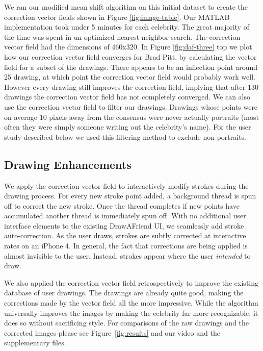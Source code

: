 We ran our modified mean shift algorithm on this initial dataset to create the correction vector fields shown in Figure \ref{fig:image-table}. Our MATLAB implementation took under 5 minutes for each celebrity.  The great majority of the time was spent in un-optimized nearest neighbor search. The correction vector field had the dimensions of 460x320. In Figure \ref{fig:daf-three} top we plot how our correction vector field converges for Brad Pitt, by calculating the vector field for a subset of the drawings. There appears to be an inflection point around 25 drawing, at which point the correction vector field would probably work well. However every drawing still improves the correction field, implying that after 130 drawings the correction vector field has not completely converged. We can also use the correction vector field to filter our drawings. Drawings whose points were on average 10 pixels away from the consensus were never actually portraits (most often they were simply someone writing out the celebrity's name). For the user study described below we used this filtering method to exclude non-portraits. 




\subsection {Drawing Enhancements}

We apply the correction vector field to interactively modify strokes during the drawing process. For every new stroke point added, a background thread is spun off to correct the new stroke. Once the thread completes if new points have accumulated another thread is immediately spun off. With no additional user interface elements to the existing DrawAFriend UI, we seamlessly add stroke auto-correction. As the user draws, strokes are subtly corrected at interactive rates on an iPhone 4. In general, the fact that corrections are being applied is almost invisible to the user. Instead, strokes appear where the user {\em intended} to draw.


We also applied the correction vector field retrospectively to improve the existing database of user drawings. The drawings are already quite good, making the corrections made by the vector field all the more impressive.  While the algorithm universally improves the images by making the celebrity far more recognizable, it does so without sacrificing style. For comparisons of the raw drawings and the corrected images please see Figure~\ref{fig:results} and our video and the supplementary files.

